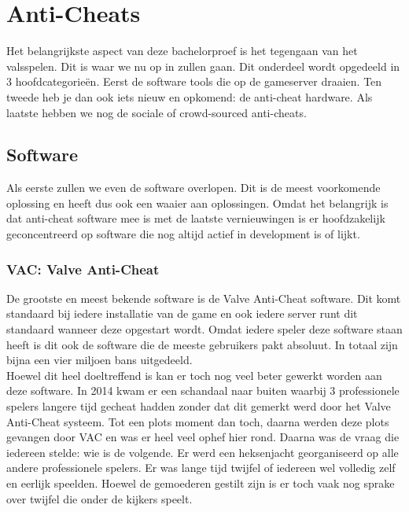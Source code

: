 \documentclass[pdftex,a4paper,12pt,twoside]{report}
\begin{document}
\chapter{Anti-Cheats}
\label{ch:anticheats}
Het belangrijkste aspect van deze bachelorproef is het tegengaan van het valsspelen. Dit is waar we nu op in zullen gaan. Dit onderdeel wordt opgedeeld in 3 hoofdcategorieën. Eerst de software tools die op de gameserver draaien. Ten tweede heb je dan ook iets nieuw en opkomend: de anti-cheat hardware. Als laatste hebben we nog de sociale of crowd-sourced anti-cheats.

\section{Software}
\label{sec:antisoftware}
Als eerste zullen we even de software overlopen. Dit is de meest voorkomende oplossing en heeft dus ook een waaier aan oplossingen. Omdat het belangrijk is dat anti-cheat software mee is met de laatste vernieuwingen is er hoofdzakelijk geconcentreerd op software die nog altijd actief in development is of lijkt. 

\subsection{VAC: Valve Anti-Cheat}
\label{sec:vac}
De grootste en meest bekende software is de Valve Anti-Cheat software. Dit komt standaard bij iedere installatie van de game en ook iedere server runt dit standaard wanneer deze opgestart wordt. \citep{VAC}Omdat iedere speler deze software staan heeft is dit ook de software die de meeste gebruikers pakt absoluut. In totaal zijn bijna een vier miljoen bans uitgedeeld.
\citep{steamdb}
\\

Hoewel dit heel doeltreffend is kan er toch nog veel beter gewerkt worden aan deze software. In 2014 kwam er een schandaal naar buiten waarbij 3 professionele spelers langere tijd gecheat hadden zonder dat dit gemerkt werd door het Valve Anti-Cheat systeem. Tot een plots moment dan toch, daarna werden deze plots gevangen door VAC en was er heel veel ophef hier rond. Daarna was de vraag die iedereen stelde: wie is de volgende. Er werd een heksenjacht georganiseerd op alle andere professionele spelers. Er was lange tijd twijfel of iedereen wel volledig zelf en eerlijk speelden. Hoewel de gemoederen gestilt zijn is er toch vaak nog sprake over twijfel die onder de kijkers speelt. \citep{pcgamerhackingscandal}
\\
\end{document}
